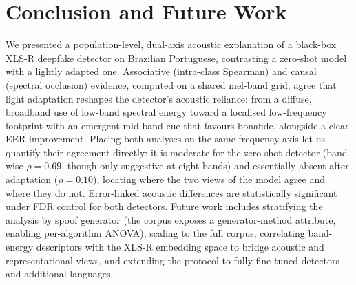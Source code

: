 \documentclass[sigconf]{acmart}
\begin{document}
\section{Conclusion and Future Work}
We presented a population-level, dual-axis acoustic explanation of a black-box
XLS-R deepfake detector on Brazilian Portuguese, contrasting a zero-shot model with
a lightly adapted one. Associative (intra-class Spearman) and causal (spectral
occlusion) evidence, computed on a shared mel-band grid, agree that light adaptation
reshapes the detector's acoustic reliance: from a diffuse, broadband use of
low-band spectral energy toward a localised low-frequency footprint with an emergent
mid-band cue that favours bonafide, alongside a clear EER improvement. Placing both
analyses on the same frequency axis let us quantify their agreement directly: it is
moderate for the zero-shot detector (band-wise $\rho=0.69$, though only suggestive at
eight bands) and essentially absent after adaptation ($\rho=0.10$), locating where
the two views of the model agree and where they do not. Error-linked acoustic
differences are statistically significant under FDR control for both detectors. Future work includes stratifying the analysis by spoof generator (the
corpus exposes a generator-method attribute, enabling per-algorithm ANOVA), scaling
to the full corpus, correlating band-energy descriptors with the XLS-R embedding
space to bridge acoustic and representational views, and extending the protocol to
fully fine-tuned detectors and additional languages.

\clearpage


\end{document}
